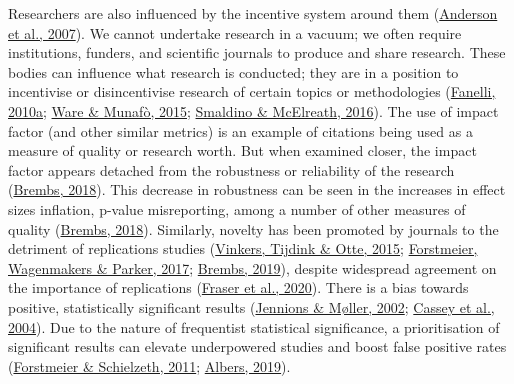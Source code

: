 \documentclass[10pt,a4paper]{article}
\begin{document}
Researchers are also influenced by the incentive system around them (\protect\hyperlink{ref-anderson_perverse_2007}{Anderson et al., 2007}).
We cannot undertake research in a vacuum; we often require institutions, funders, and scientific journals to produce and share research.
These bodies can influence what research is conducted; they are in a position to incentivise or disincentivise research of certain topics or methodologies (\protect\hyperlink{ref-fanelli_pressures_2010}{Fanelli, 2010a}; \protect\hyperlink{ref-ware_significance_2015}{Ware \& Munafò, 2015}; \protect\hyperlink{ref-smaldino_natural_2016}{Smaldino \& McElreath, 2016}).
The use of impact factor (and other similar metrics) is an example of citations being used as a measure of quality or research worth.
But when examined closer, the impact factor appears detached from the robustness or reliability of the research (\protect\hyperlink{ref-Brembs2018}{Brembs, 2018}).
This decrease in robustness can be seen in the increases in effect sizes inflation, p-value misreporting, among a number of other measures of quality (\protect\hyperlink{ref-Brembs2018}{Brembs, 2018}).
Similarly, novelty has been promoted by journals to the detriment of replications studies (\protect\hyperlink{ref-vinkers_use_2015}{Vinkers, Tijdink \& Otte, 2015}; \protect\hyperlink{ref-forstmeier_detecting_2017}{Forstmeier, Wagenmakers \& Parker, 2017}; \protect\hyperlink{ref-brembs_reliable_2019}{Brembs, 2019}), despite widespread agreement on the importance of replications (\protect\hyperlink{ref-fraser_role_2020}{Fraser et al., 2020}).
There is a bias towards positive, statistically significant results (\protect\hyperlink{ref-jennions_publication_2002}{Jennions \& Møller, 2002}; \protect\hyperlink{ref-cassey_survey_2004}{Cassey et al., 2004}).
Due to the nature of frequentist statistical significance, a prioritisation of significant results can elevate underpowered studies and boost false positive rates (\protect\hyperlink{ref-forstmeier_cryptic_2011}{Forstmeier \& Schielzeth, 2011}; \protect\hyperlink{ref-albers_problem_2019}{Albers, 2019}).
\end{document}
